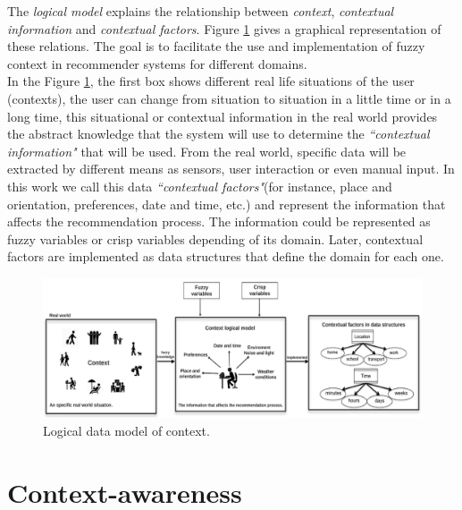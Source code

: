 The \textit{logical model} explains the relationship between \textit{context},
\textit{contextual information} and \textit{contextual factors}. 
Figure \ref{fig:logicalmodel} gives a graphical representation of these relations. 
The goal is to facilitate the use and implementation of fuzzy context 
in recommender systems for different domains.\\
In the Figure \ref{fig:logicalmodel}, the first box shows different
real life situations of the user (contexts), the user can change from situation
to situation in a little time or in a long time, this situational or
contextual information in the real world provides the abstract knowledge that
the system will use to determine the \textit{``contextual information"} that will 
be used. 
From the real world, specific data will be extracted by different means as
sensors, user interaction or even manual input. In this work 
we call this data \textit{``contextual factors"}(for instance, place and
orientation, preferences, date and time, etc.) and represent the
information that affects the recommendation process. The information
could be represented as fuzzy variables or crisp variables depending of
its domain. Later, contextual factors are implemented as data
structures that define the domain for each one. 
\begin{figure}
\captionsetup{font=footnotesize} \centering
\includegraphics[width=1.0\textwidth]{img/context-scheme.png}  
\small
\caption{Logical data model of context.}
\label{fig:logicalmodel}    
\end{figure} %

\section{Context-awareness} \label{context-awareness}

